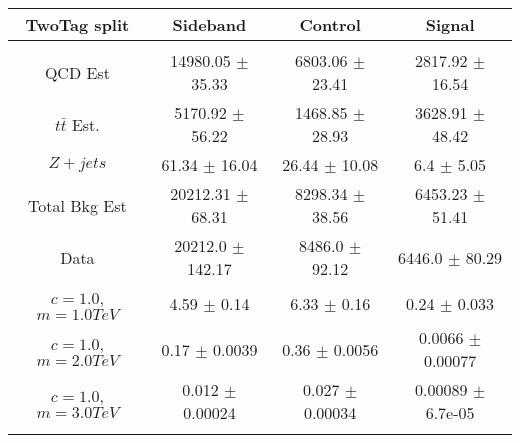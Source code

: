 \begin{footnotesize} 
\begin{tabular}{c|c|c|c} 
TwoTag split & Sideband & Control & Signal \\ 
\hline\hline 
& & & \\ 
QCD Est & 14980.05 $\pm$ 35.33 & 6803.06 $\pm$ 23.41 & 2817.92 $\pm$ 16.54\\ 
$t\bar{t}$ Est.  & 5170.92 $\pm$ 56.22 & 1468.85 $\pm$ 28.93 & 3628.91 $\pm$ 48.42\\ 
$Z+jets$ & 61.34 $\pm$ 16.04 & 26.44 $\pm$ 10.08 & 6.4 $\pm$ 5.05\\ 
Total Bkg Est & 20212.31 $\pm$ 68.31 & 8298.34 $\pm$ 38.56 & 6453.23 $\pm$ 51.41\\ 
Data & 20212.0 $\pm$ 142.17 & 8486.0 $\pm$ 92.12 & 6446.0 $\pm$ 80.29\\ 
$c=1.0$,$m=1.0TeV$ & 4.59 $\pm$ 0.14 & 6.33 $\pm$ 0.16 & 0.24 $\pm$ 0.033\\ 
$c=1.0$,$m=2.0TeV$ & 0.17 $\pm$ 0.0039 & 0.36 $\pm$ 0.0056 & 0.0066 $\pm$ 0.00077\\ 
$c=1.0$,$m=3.0TeV$ & 0.012 $\pm$ 0.00024 & 0.027 $\pm$ 0.00034 & 0.00089 $\pm$ 6.7e-05\\ 
& & & \\ 
\hline\hline 
\end{tabular} 
\end{footnotesize} 
\newline 
